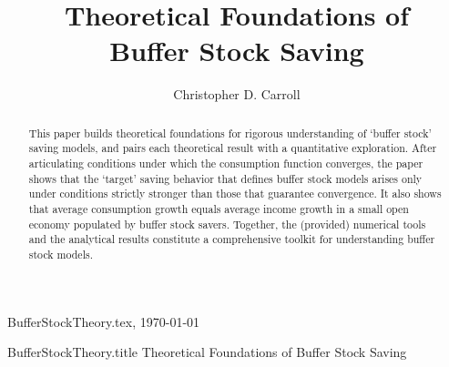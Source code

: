 \documentclass[titlepage]{\econtex}\providecommand{\texname}{BufferStockTheory}
\providecommand{\onlyinsubfile}{}
\providecommand{\notinsubfile}{}
\renewcommand{\onlyinsubfile}[1]{}
\renewcommand{\notinsubfile}[1]{#1}
\begin{document}

\renewcommand{\onlyinsubfile}[1]{}\renewcommand{\notinsubfile}[1]{#1} 

\hfill{\tiny \texname.tex, \today}

\begin{verbatimwrite}{\texname.title}
Theoretical Foundations of Buffer Stock Saving
\end{verbatimwrite}


\title{Theoretical Foundations of \\ Buffer Stock Saving}

\author{Christopher D. Carroll\authNum}




\maketitle 


\hypertarget{abstract}{}
\begin{abstract}
  This paper builds theoretical foundations for rigorous understanding of `buffer stock' saving models, and pairs each theoretical result with a quantitative exploration.  After articulating conditions under which the consumption function converges, the paper shows that the `target' saving behavior that defines buffer stock models arises only under conditions strictly stronger than those that guarantee convergence.  It also shows that average consumption growth equals average income growth in a small open economy populated by buffer stock savers.  Together, the (provided) numerical tools and the analytical results constitute a comprehensive toolkit for understanding buffer stock models.
\end{abstract}
\end{document}
